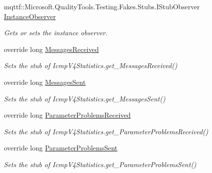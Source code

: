 \begin{DoxyCompactItemize}
mqttf\-::\-Microsoft.\-Quality\-Tools.\-Testing.\-Fakes.\-Stubs.\-I\-Stub\-Observer \hyperlink{class_system_1_1_net_1_1_network_information_1_1_fakes_1_1_stub_icmp_v4_statistics_a10ef5657c56429dd31c89a2a4df3e180}{Instance\-Observer}
\begin{DoxyCompactList}\small\item\em Gets or sets the instance observer.\end{DoxyCompactList}\item 
override long \hyperlink{class_system_1_1_net_1_1_network_information_1_1_fakes_1_1_stub_icmp_v4_statistics_a801dff78f10146c46bc78c7b857fa87e}{Messages\-Received}
\begin{DoxyCompactList}\small\item\em Sets the stub of Icmp\-V4\-Statistics.\-get\-\_\-\-Messages\-Received()\end{DoxyCompactList}\item 
override long \hyperlink{class_system_1_1_net_1_1_network_information_1_1_fakes_1_1_stub_icmp_v4_statistics_ade5ca6f47ac6ef2ed3889d5e4ea3b58e}{Messages\-Sent}
\begin{DoxyCompactList}\small\item\em Sets the stub of Icmp\-V4\-Statistics.\-get\-\_\-\-Messages\-Sent()\end{DoxyCompactList}\item 
override long \hyperlink{class_system_1_1_net_1_1_network_information_1_1_fakes_1_1_stub_icmp_v4_statistics_afd15a2f58e444021592b7b3a72c1e40c}{Parameter\-Problems\-Received}
\begin{DoxyCompactList}\small\item\em Sets the stub of Icmp\-V4\-Statistics.\-get\-\_\-\-Parameter\-Problems\-Received()\end{DoxyCompactList}\item 
override long \hyperlink{class_system_1_1_net_1_1_network_information_1_1_fakes_1_1_stub_icmp_v4_statistics_a7aeaf5cc7d4ab31bca68481b26f24e5c}{Parameter\-Problems\-Sent}
\begin{DoxyCompactList}\small\item\em Sets the stub of Icmp\-V4\-Statistics.\-get\-\_\-\-Parameter\-Problems\-Sent()\end{DoxyCompactList}\item 

\end{DoxyCompactItemize}
